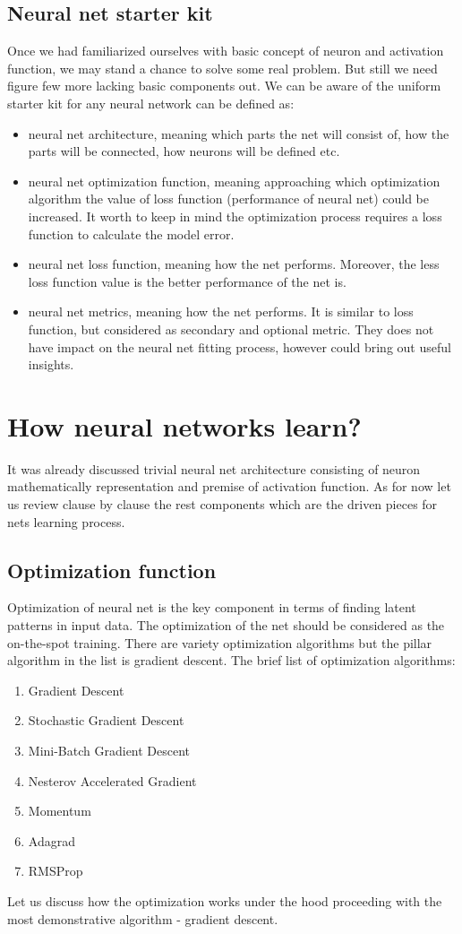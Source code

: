 \subsection{Neural net starter kit}
Once we had familiarized ourselves with basic concept of neuron and activation function, we may stand a chance to solve some real problem. But still we need figure few more lacking basic components out.
We can be aware of the uniform starter kit for any neural network can be defined as:
\begin{itemize}
    \item neural net architecture, meaning which parts the net will consist of, how the parts will be connected, how neurons will be defined etc.
    \item neural net optimization function, meaning approaching which optimization algorithm the value of loss function (performance of neural net) could be increased. It worth to keep in mind the optimization process requires a loss function to calculate the model error.
    \item neural net loss function, meaning how the net performs. Moreover, the less loss function value is the better performance of the net is.
    \item neural net metrics, meaning how the net performs. It is similar to loss function, but considered as secondary and optional metric. They does not have impact on the neural net fitting process, however could bring out useful insights.    
\end{itemize}


\section{How neural networks learn?}
It was already discussed trivial neural net architecture consisting of neuron mathematically representation and premise of activation function. As for now let us review clause by clause the rest components which are the driven pieces for nets learning process.

\subsection{Optimization function}
Optimization of neural net is the key component in terms of finding latent patterns in input data. The optimization of the net should be considered as the on-the-spot training. There are variety optimization algorithms but the pillar algorithm in the list is gradient descent.
The brief list of optimization algorithms:
\begin{enumerate}
    \item Gradient Descent
    \item Stochastic Gradient Descent
    \item Mini-Batch Gradient Descent
    \item Nesterov Accelerated Gradient
    \item Momentum
    \item Adagrad
    \item RMSProp
\end{enumerate}
Let us discuss how the optimization works under the hood proceeding with the most demonstrative algorithm - gradient descent.

